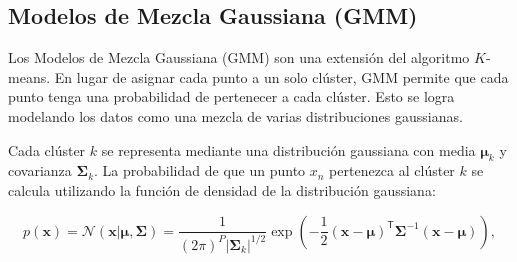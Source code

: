 \subsection{Modelos de Mezcla Gaussiana (GMM)}

Los Modelos de Mezcla Gaussiana (GMM) son una extensión del algoritmo \(K\)-means. En lugar de asignar cada punto a un solo clúster, GMM permite que cada punto tenga una probabilidad de pertenecer a cada clúster. Esto se logra modelando los datos como una mezcla de varias distribuciones gaussianas.

Cada clúster \(k\) se representa mediante una distribución gaussiana con media \(\boldsymbol{\mu}_k\) y covarianza \(\boldsymbol{\Sigma}_k\). La probabilidad de que un punto \(x_n\) pertenezca al clúster \(k\) se calcula utilizando la función de densidad de la distribución gaussiana:

\[
p(\boldsymbol{x}) = \mathcal{N}(\boldsymbol{x} | \boldsymbol{\mu}, \boldsymbol{\Sigma}
)=\frac{1}{(2\pi)^{P} |\boldsymbol{\Sigma}_k|^{1/2}} \exp\left(-\frac{1}{2} (\boldsymbol{x} - \boldsymbol{\mu})^\mathsf{T} \boldsymbol{\Sigma}^{-1} (\boldsymbol{x} - \boldsymbol{\mu})\right),
\]



